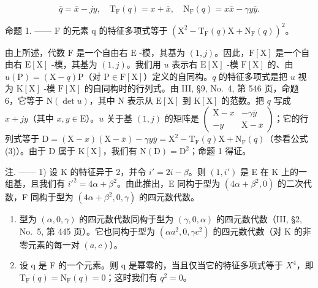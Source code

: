 \[
\overline {{q}} = \overline {{x}} - j y, \quad \mathrm{T} _ {\mathrm{F}} (q) = x + \overline {{x}}, \quad \mathrm{N} _ {\mathrm{F}} (q) = x \overline {{x}} - \gamma y \overline {{y}}.\tag{3}
\]

命题 1. —— F 的元素 q 的特征多项式等于 \(\left(\mathrm{X}^{2}-\mathrm{T}_{\mathrm{F}}(q)\mathrm{X}+\mathrm{N}_{\mathrm{F}}(q)\right)^{2}\)。

由上所述，代数 \(\mathrm{F}\) 是一个自由右 \(\mathrm{E}\) -模，其基为 \((1,j)\)。因此，\(\mathrm{F}[\mathrm{X}]\) 是一个自由右 \(\mathrm{E}[\mathrm{X}]\) -模，其基为 \((1,j)\)。我们用 \(u\) 表示右 \(\mathrm{E}[\mathrm{X}]\) -模 \(\mathrm{F}[\mathrm{X}]\) 的、由 \(u(\mathrm{P}) = (\mathrm{X} - q)\mathrm{P}\)（对 \(\mathrm{P} \in \mathrm{F}[\mathrm{X}]\)）定义的自同构。\(q\) 的特征多项式是把 \(u\) 视为 \(\mathrm{K}[\mathrm{X}]\) -模 \(\mathrm{F}[\mathrm{X}]\) 的自同构时的行列式。由 III, §9, No.~4, 第 546 页，命题 6，它等于 \(\mathrm{N}(\det u)\)，其中 \(\mathrm{N}\) 表示从 \(\mathrm{E}[\mathrm{X}]\) 到 \(\mathrm{K}[\mathrm{X}]\) 的范数。把 \(q\) 写成 \(x + jy\)（其中 \(x, y \in \mathrm{E}\)）。\(u\) 关于基 \((1,j)\) 的矩阵是 \(\begin{pmatrix} \mathrm{X} - x & -\gamma \overline{y} \\ -y & \mathrm{X} - \overline{x} \end{pmatrix}\)；它的行列式等于 \(\mathrm{D} = (\mathrm{X} - x)(\mathrm{X} - \overline{x}) - \gamma y\overline{y} = \mathrm{X}^2 - \mathrm{T}_{\mathrm{F}}(q)\mathrm{X} + \mathrm{N}_{\mathrm{F}}(q)\)（参看公式 (3)）。由于 \(\mathrm{D}\) 属于 \(\mathrm{K}[\mathrm{X}]\)，我们有 \(\mathrm{N}(\mathrm{D}) = \mathrm{D}^2\)；命题 1 得证。

注. —— 1) 设 K 的特征异于 2，并令 \(i' = 2i - \beta\)。则 \((1, i')\) 是 E 在 K 上的一组基，且我们有 \(i'^2 = 4\alpha + \beta^2\)。由此推出，E 同构于型为 \((4\alpha + \beta^2, 0)\) 的二次代数，F 同构于型为 \((4\alpha + \beta^2, 0, \gamma)\) 的四元数代数。

\begin{enumerate}
\def\labelenumi{\arabic{enumi})}
\setcounter{enumi}{1}
\item
  型为 \((\alpha,0,\gamma)\) 的四元数代数同构于型为 \((\gamma,0,\alpha)\) 的四元数代数（III, §2, No.~5, 第 445 页）。它也同构于型为 \((\alpha a^{2},0,\gamma c^{2})\) 的四元数代数（对 K 的非零元素的每一对 \((a,c)\)）。
\item
  设 q 是 F 的一个元素。则 q 是幂零的，当且仅当它的特征多项式等于 \(X^{4}\)，即 \(\mathrm{T}_{\mathrm{F}}(q)=\mathrm{N}_{\mathrm{F}}(q)=0\)；这时我们有 \(q^{2}=0\)。
\end{enumerate}

